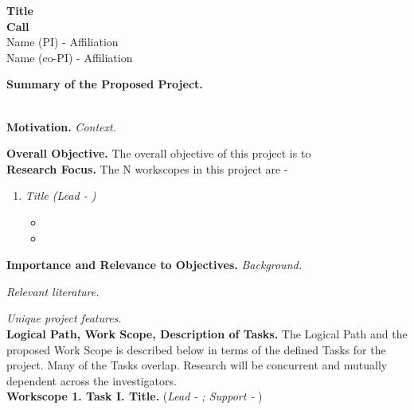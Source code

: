 \documentclass[11pt,letterpaper]{article}
\begin{document}
{\centering 
    \textbf{Title\\
    Call \\
    }
    Name (PI) - Affiliation\\
    Name (co-PI) - Affiliation 
\par
}
\vspace{\baselineskip}

\noindent\textbf{Summary of the Proposed Project.} 

\noindent 
\\
\noindent\textbf{Motivation.} \textit{Context.} 

\noindent\textbf{Overall Objective.} The overall objective of this project is to 
\\

\noindent\textbf{Research Focus.} The N workscopes in this project are - 
\begin{enumerate}[topsep=0pt,itemsep=-1ex,partopsep=1ex,parsep=1ex]
    \item\textit{Title (Lead - )}
        \begin{itemize}[topsep=-1ex,itemsep=-1ex,partopsep=1ex,parsep=1ex]
            \item
            \item
        \end{itemize}
\end{enumerate}

\vspace{\baselineskip}

\noindent\textbf{Importance and Relevance to Objectives.} \textit{Background.} 

\textit{Relevant literature.} 

\textit{Unique project features.} 
\\

\noindent\textbf{Logical Path, Work Scope, Description of Tasks.} The Logical Path and the proposed Work Scope is described below in terms of the defined Tasks for the project. Many of the Tasks overlap. Research will be concurrent and mutually dependent across the investigators.\\

\noindent\textbf{Workscope 1. Task I. Title.} (\textit{Lead - ; Support - }) 
\\
\end{document}
